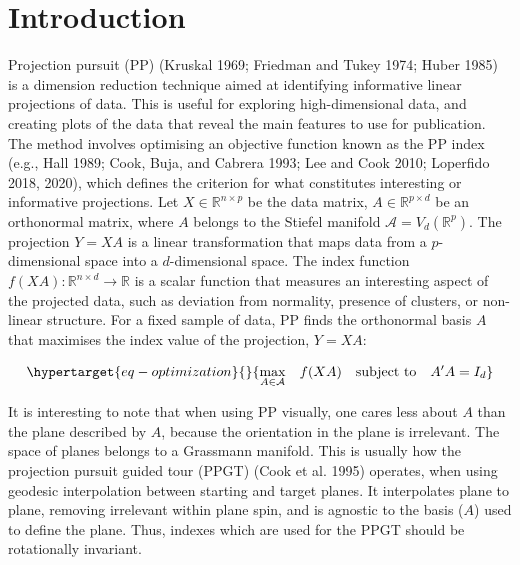 \documentclass[
  12pt,
]{interact}
\theoremstyle{plain}
\begin{document}
\hypertarget{introduction}{%
\section{Introduction}\label{introduction}}

Projection pursuit (PP) (Kruskal 1969; Friedman and Tukey 1974; Huber
1985) is a dimension reduction technique aimed at identifying
informative linear projections of data. This is useful for exploring
high-dimensional data, and creating plots of the data that reveal the
main features to use for publication. The method involves optimising an
objective function known as the PP index (e.g., Hall 1989; Cook, Buja,
and Cabrera 1993; Lee and Cook 2010; Loperfido 2018, 2020), which
defines the criterion for what constitutes interesting or informative
projections. Let \(X \in \mathbb{R}^{n\times p}\) be the data matrix,
\(A \in\mathbb{R}^{p \times d}\) be an orthonormal matrix, where \(A\)
belongs to the Stiefel manifold \(\mathcal{A} = V_d(\mathbb{R}^p)\). The
projection \(Y = XA\) is a linear transformation that maps data from a
\(p\)-dimensional space into a \(d\)-dimensional space. The index
function \(f(XA): \mathbb{R}^{n \times d} \to \mathbb{R}\) is a scalar
function that measures an interesting aspect of the projected data, such
as deviation from normality, presence of clusters, or non-linear
structure. For a fixed sample of data, PP finds the orthonormal basis
\(A\) that maximises the index value of the projection, \(Y = XA\):

\begin{equation}\protect\hypertarget{eq-optimization}{}{
\underset{A \in \mathcal{A}}{\max } \quad f(XA) \quad \text{subject to} \quad A'A = I_d
}\label{eq-optimization}\end{equation}

It is interesting to note that when using PP visually, one cares less
about \(A\) than the plane described by \(A\), because the orientation
in the plane is irrelevant. The space of planes belongs to a Grassmann
manifold. This is usually how the projection pursuit guided tour (PPGT)
(Cook et al. 1995) operates, when using geodesic interpolation between
starting and target planes. It interpolates plane to plane, removing
irrelevant within plane spin, and is agnostic to the basis (\(A\)) used
to define the plane. Thus, indexes which are used for the PPGT should be
rotationally invariant.
\end{document}
